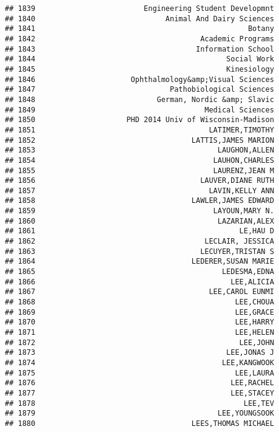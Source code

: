 \documentclass[
]{article}
\begin{document}
\begin{verbatim}
## 1839                         Engineering Student Developmnt
## 1840                              Animal And Dairy Sciences
## 1841                                                 Botany
## 1842                                      Academic Programs
## 1843                                     Information School
## 1844                                            Social Work
## 1845                                            Kinesiology
## 1846                      Ophthalmology&amp;Visual Sciences
## 1847                               Pathobiological Sciences
## 1848                            German, Nordic &amp; Slavic
## 1849                                       Medical Sciences
## 1850                     PHD 2014 Univ of Wisconsin-Madison
## 1851                                        LATIMER,TIMOTHY
## 1852                                    LATTIS,JAMES MARION
## 1853                                          LAUGHON,ALLEN
## 1854                                         LAUHON,CHARLES
## 1855                                         LAURENZ,JEAN M
## 1856                                      LAUVER,DIANE RUTH
## 1857                                        LAVIN,KELLY ANN
## 1858                                    LAWLER,JAMES EDWARD
## 1859                                         LAYOUN,MARY N.
## 1860                                          LAZARIAN,ALEX
## 1861                                               LE,HAU D
## 1862                                       LECLAIR, JESSICA
## 1863                                      LECUYER,TRISTAN S
## 1864                                    LEDERER,SUSAN MARIE
## 1865                                           LEDESMA,EDNA
## 1866                                             LEE,ALICIA
## 1867                                        LEE,CAROL EUNMI
## 1868                                              LEE,CHOUA
## 1869                                              LEE,GRACE
## 1870                                              LEE,HARRY
## 1871                                              LEE,HELEN
## 1872                                               LEE,JOHN
## 1873                                            LEE,JONAS J
## 1874                                           LEE,KANGWOOK
## 1875                                              LEE,LAURA
## 1876                                             LEE,RACHEL
## 1877                                             LEE,STACEY
## 1878                                                LEE,TEV
## 1879                                          LEE,YOUNGSOOK
## 1880                                    LEES,THOMAS MICHAEL

\end{verbatim}
\end{document}
